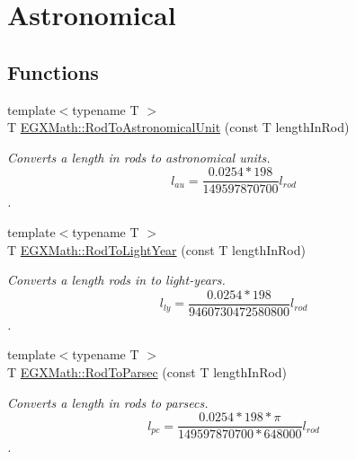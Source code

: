 \hypertarget{group___e_g_x_math-_conversions-_length_conversions-_imperial-_rod-_astronomical}{}\section{Astronomical}
\label{group___e_g_x_math-_conversions-_length_conversions-_imperial-_rod-_astronomical}
\subsection*{Functions}
\begin{DoxyCompactItemize}
\item 
{\footnotesize template$<$typename T $>$ }\\T \mbox{\hyperlink{group___e_g_x_math-_conversions-_length_conversions-_imperial-_rod-_astronomical_ga320c74af81e2f062967e5c767d089a87}{E\+G\+X\+Math\+::\+Rod\+To\+Astronomical\+Unit}} (const T length\+In\+Rod)
\begin{DoxyCompactList}\small\item\em Converts a length in rods to astronomical units. \[ l_{au}=\frac{0.0254 * 198}{149597870700} l_{rod} \]. \end{DoxyCompactList}\item 
{\footnotesize template$<$typename T $>$ }\\T \mbox{\hyperlink{group___e_g_x_math-_conversions-_length_conversions-_imperial-_rod-_astronomical_gae5824aa8a60a3fe280de82b165cc0ed7}{E\+G\+X\+Math\+::\+Rod\+To\+Light\+Year}} (const T length\+In\+Rod)
\begin{DoxyCompactList}\small\item\em Converts a length rods in to light-\/years. \[ l_{ly}=\frac{0.0254 * 198}{9460730472580800} l_{rod} \]. \end{DoxyCompactList}\item 
{\footnotesize template$<$typename T $>$ }\\T \mbox{\hyperlink{group___e_g_x_math-_conversions-_length_conversions-_imperial-_rod-_astronomical_ga720b170a8c3243d0f7d5be0c70381cb2}{E\+G\+X\+Math\+::\+Rod\+To\+Parsec}} (const T length\+In\+Rod)
\begin{DoxyCompactList}\small\item\em Converts a length in rods to parsecs. \[ l_{pc}=\frac{0.0254 * 198 * \pi}{149597870700 * 648000} l_{rod} \]. \end{DoxyCompactList}\end{DoxyCompactItemize}


